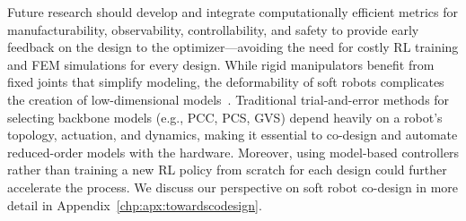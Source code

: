 Future research should develop and integrate computationally efficient metrics for manufacturability, observability, controllability, and safety to provide early feedback on the design to the optimizer—avoiding the need for costly \gls{RL} training and \gls{FEM} simulations for every design. While rigid manipulators benefit from fixed joints that simplify modeling, the deformability of soft robots complicates the creation of low-dimensional models~\citep{armanini2023soft}. Traditional trial-and-error methods for selecting backbone models (e.g., \gls{PCC}, \gls{PCS}, \gls{GVS}) depend heavily on a robot’s topology, actuation, and dynamics, making it essential to co-design and automate reduced-order models with the hardware. Moreover, using model-based controllers rather than training a new \gls{RL} policy from scratch for each design could further accelerate the process. We discuss our perspective on soft robot co-design in more detail in Appendix~\ref{chp:apx:towardscodesign}.


